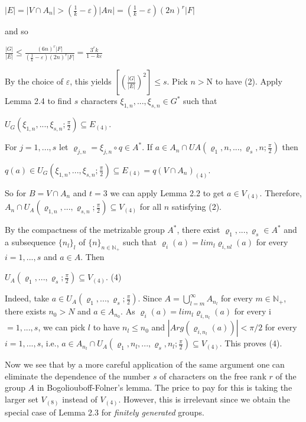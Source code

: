 \documentclass[12pt]{article}
\begin{document}
        $|E|=|V \cap A_n| > (\frac{1}{k} - \varepsilon) |An| = (\frac{1}{k} - \varepsilon)(2n)^r|F|$


    and so


        $\frac{|G|}{|E|} \leqslant \frac{(6n)^r |F|}{(\frac{1}{k} - \varepsilon) (2n)^r |F|} = \frac{3^r k}{1 - k \varepsilon}$


    By the choice of $\varepsilon$, this yields $[(\frac{|G|}{|E|})^2] \leqslant  s$. Pick $n > $N to have (2). Apply Lemma 2.4 to find $s$ characters $\xi_{1,n},...,\xi_{s,n} ∈ G^*$
    such that


        $U_G (\xi_{1,n},...,\xi_{s,n}; \frac{\pi}{2}) \subseteq E_{(4)}$.


    For $j = 1,..., s$ let $\varrho_{j,n} = \xi_{j,n} \circ q \in A^*$. If $a \in A_n \cap U A(\varrho_1,n,...,\varrho_s,n; \frac{\pi}{2} )$ then


        $q(a) \in U_G (\xi_{1,n},...,\xi_{s,n}; \frac{\pi}{2}) \subseteq E_{(4)} = q(V \cap A_n)_{(4)}$.


    So for $B = V \cap A_n$ and $t = 3$ we can apply Lemma 2.2 to get $a \in V_{(4)}$. Therefore, $A_n \cap U_A(\varrho_{1,n},...,\varrho_{s,n}; \frac{\pi}{2} ) \subseteq V_{(4)}$ for all $n$
    satisfying (2).


        By the compactness of the metrizable group $A^*$, there exist $\varrho_1,...,\varrho_s \in A^*$ and a subsequence $\{n_l\}_l$ of $\{n\}_{n \in \mathbb{N}_+}$ such that
    $\varrho_i(a) = lim_l \varrho_{i,nl} (a)$ for every $i = 1,..., s$ and $a \in A$. Then


    $U_A (\varrho_1,...,\varrho_s ;\frac{\pi}{2}) \subseteq V_{(4)}$. (4)


        Indeed, take $a \in U_A(\varrho_1,...,\varrho_s; \frac{\pi}{2})$. Since $A = \bigcup^{\infty}_{l=m} A_{n_l}$ for every $m \in \mathbb{N}_+$, there exists $n_0 > N$ and $a \in A_{n_0}$. As
    $\varrho_i(a) = lim_l \varrho_{i,n_l}(a)$ for every i$ = 1,..., s$, we can pick $l$ to have $n_l \leqslant n_0$ and $|Arg(\varrho_{i,n_l} (a))| < \pi/2$ for every $i = 1,..., s$, i.e.,
    $a \in A_{n_l} \cap U_A(\varrho_1,n_l,...,\varrho_s,n_l; \frac{\pi}{2} ) \subseteq V_{(4)}$. This proves (4). 


        Now we see that by a more careful application of the same argument one can eliminate the dependence of the number $s$
    of characters on the free rank $r$ of the group $A$ in Bogoliouboff-Folner's lemma. The price to pay for this is taking the larger
    set $V_{(8)}$ instead of $V_{(4)}$. However, this is irrelevant since we obtain the special case of Lemma 2.3 for \emph{finitely generated} groups.
\end{document}
